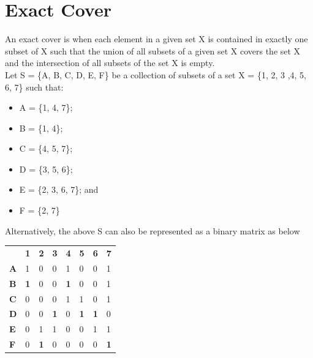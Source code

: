 \documentclass[a4paper,oneside,11pt]{report}
\begin{document}
\section{Exact Cover}
An exact cover is when each element in a given set X is contained in exactly one subset of X such that  the union of all subsets of a given set X covers the set X and the intersection of all subsets of the set X is empty. \\
Let S = \{A, B, C, D, E, F\} be a collection of subsets of a set X = \{1, 2, 3 ,4, 5, 6, 7\} such that:
\begin{center}
\begin{minipage}{0.5\linewidth}
\begin{itemize}
\item A = \{1, 4, 7\};
\vspace{-0.5cm}
\item B = \{1, 4\};
\vspace{-0.5cm}
\item C = \{4, 5, 7\};
\vspace{-0.5cm}
\item D = \{3, 5, 6\};
\vspace{-0.5cm}
\item E = \{2, 3, 6, 7\}; and
\vspace{-0.5cm}
\item F = \{2, 7\}\\
\end{itemize}
\end{minipage}
\end{center}
\newpage
\noindent Alternatively, the above S can also be represented as a binary matrix as below\\
\begin{center}
\begin{tabular}{ m{0.5cm}  m{0.5cm} m{0.5cm} m{0.5cm} m{0.5cm} m{0.5cm} m{0.5cm} m{0.5cm}} 
& \textbf{1} & \textbf{2} & \textbf{3} & \textbf{4} & \textbf{5} & \textbf{6} & \textbf{7}\\ 
\textbf{A} & 1 & 0 & 0 & 1 & 0 & 0 & 1\\ 
\textbf{B} & \textbf{1} & 0 & 0 & \textbf{1} & 0 & 0 & 1\\ 
\textbf{C} & 0 & 0 & 0 & 1 & 1 & 0 & 1\\
\textbf{D} & 0 & 0 & \textbf{1} & 0 & \textbf{1} & \textbf{1} & 0\\
\textbf{E} & 0 & 1 & 1 & 0 & 0 & 1 & 1\\
\textbf{F} & 0 & \textbf{1} & 0 & 0 & 0 & 0 & \textbf{1}\\
\end{tabular}
\end{center}
\end{document}
